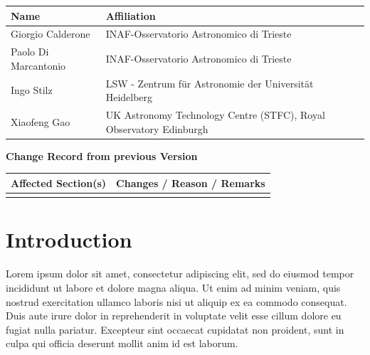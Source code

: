 \documentclass[12pt,a4paper]{article}
\begin{document}

\esoheader{}

\begin{tabular}{ |p{}|p{}| }
  \hline
      {\bf Name} & {\bf Affiliation}\\
      \hline
      Giorgio Calderone     & INAF-Osservatorio Astronomico di Trieste \\
      Paolo Di Marcantonio  & INAF-Osservatorio Astronomico di Trieste \\
      Ingo Stilz            & LSW - Zentrum für Astronomie der Universität Heidelberg \\
      Xiaofeng Gao          & UK Astronomy Technology Centre (STFC), Royal Observatory Edinburgh\\
      \hline
\end{tabular}

\vspace{3cm}

{\Large \bf Change Record from previous Version}
\medskip

\begin{tabular}{ |p{}|p{}| }
  \hline
      {\bf Affected Section(s)} & {\bf Changes / Reason / Remarks}\\
      \hline
       & \\
      \hline
\end{tabular}

\newpage

\tableofcontents

\newpage

\section{Introduction}

Lorem ipsum dolor sit amet, consectetur adipiscing elit, sed do eiusmod tempor incididunt ut labore et dolore magna aliqua. Ut enim ad minim veniam, quis nostrud exercitation ullamco laboris nisi ut aliquip ex ea commodo consequat. Duis aute irure dolor in reprehenderit in voluptate velit esse cillum dolore eu fugiat nulla pariatur. Excepteur sint occaecat cupidatat non proident, sunt in culpa qui officia deserunt mollit anim id est laborum.
\end{document}
